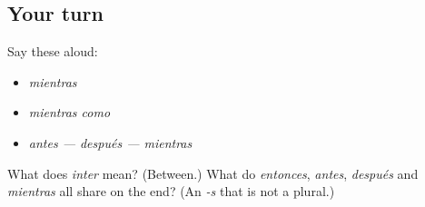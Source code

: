 \subsection*{Your turn}
Say these aloud:

\begin{itemize}
\raggedright
  \item \emph{mientras}
  \item \emph{mientras como}
  \item \emph{antes — después — mientras}
\end{itemize}

\begin{tcolorbox}[breakable,colback=teal!4,colframe=teal!35!black,title={Before you move on}]
What does \emph{inter} mean? (Between.) What do \emph{entonces}, \emph{antes}, \emph{después} and \emph{mientras} all share on the end? (An \emph{-s} that is not a plural.)
\end{tcolorbox}
